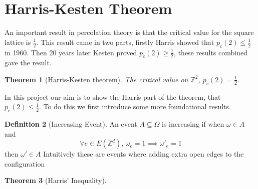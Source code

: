 \documentclass[a4paper,11pt]{article}
\newtheorem{theorem}{Theorem}[section]
\theoremstyle{definition}
\newtheorem{definition}[theorem]{Definition}
\newcommand{\ints}{\mathbb{Z}}
\begin{document}
{\color{red}{TODO: explain percolation function is non-decreasing in d?}}


\section{Harris-Kesten Theorem}
An important result in percolation theory is that the critical value for the square lattice is $\frac{1}{2}$. 
This result came in two parts, firstly Harris \cite{harris_1960} showed that $p_c(2) \leq \frac{1}{2}$ in 1960.
Then 20 years later Kesten \cite{kesten1980critical} proved $p_c(2) \geq \frac{1}{2}$, these results combined gave the result.

\begin{theorem}[Harris-Kesten theorem]
	The critical value on $\ints^2$,  $p_c(2) =  \frac{1}{2}$.
\end{theorem}
In this project our aim is to show the Harris part of the theorem, that $p_c(2) \leq \frac{1}{2}$. 
To do this we first introduce some more foundational results.

\begin{definition}[Increasing Event]
	An event $ A \subseteq \Omega$ is increasing if when $\omega \in A$ and
	$$\forall e \in E(\ints^d) \text{, } \omega_e = 1 \implies \omega'_e = 1$$
	then $\omega' \in A$
	Intuitively these are events where adding extra open edges to the configuration 
\end{definition}

\begin{theorem}[Harris' Inequality]

\end{theorem}




\end{document}
